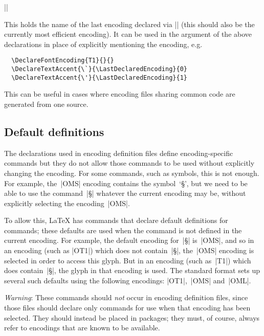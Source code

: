 \documentclass{ltxguide}[1995/11/28]
\begin{document}
\begin{decl}[1998/12/01]
   |\LastDeclaredEncoding|
\end{decl}
This holds the name of the last encoding declared via
|\DeclareFontEncoding| (this should also be the currently most
efficient encoding).  It can be used in the  argument
of the above declarations in place of explicitly mentioning the
encoding, e.g.
\begin{verbatim}
  \DeclareFontEncoding{T1}{}{}
  \DeclareTextAccent{\`}{\LastDeclaredEncoding}{0}
  \DeclareTextAccent{\'}{\LastDeclaredEncoding}{1}
\end{verbatim}
This can be useful in cases where encoding files sharing common code
are generated from one source.  


\subsection{Default definitions}
 
The declarations used in encoding definition files define
encoding-specific commands but they do not allow those commands to be
used without explicitly changing the encoding.  For some commands,
such as symbols, this is not enough.  For example, the~|OMS| encoding
contains the symbol~`\S', but we need to be able to use the
command~|\S| whatever the current encoding may be, without explicitly
selecting the encoding~|OMS|.
   
To allow this, \LaTeX{} has commands that declare default definitions
for commands; these defaults are used when the command is not defined
in the current encoding.  For example, the default encoding for~|\S|
is~|OMS|, and so in an encoding (such as |OT1|) which does not
contain~|\S|, the~|OMS| encoding is selected in order to access this
glyph.  But in an encoding (such as~|T1|) which does contain~|\S|, the
glyph in that encoding is used.  The standard \LaTeXe{} format sets
up several such defaults using the following encodings: |OT1|,~|OMS|
and~|OML|.

\emph{Warning}: These commands should \emph{not} occur in encoding
definition files, since those files should declare only commands for use
when that encoding has been selected.  They should instead be placed
in packages; they must, of course, always refer to encodings that are
known to be available.
 
\end{document}
